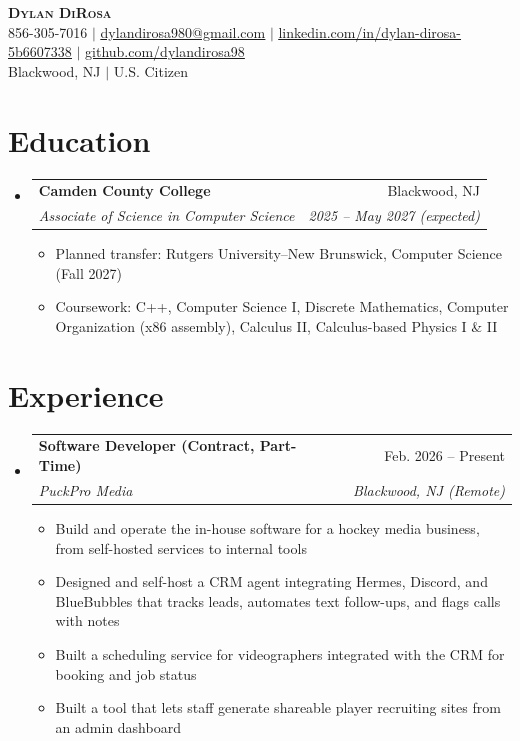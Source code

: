 \documentclass[letterpaper,11pt]{article}
\makeatletter
\newcommand{\resumeItem}[1]{
  \item\small{#1}
}
\newcommand{\resumeSubheading}[4]{
  \item
    \begin{tabular*}{0.97\textwidth}[t]{l@{\extracolsep{\fill}}r}
      \textbf{#1} & #2 \\[2pt]
      \textit{\small#3} & \textit{\small #4} \\
    \end{tabular*}
}
\newcommand{\resumeSubHeadingListStart}{\begin{itemize}[leftmargin=0.15in, label={}, itemsep=8pt, parsep=0pt, topsep=2pt, partopsep=0pt]}
\newcommand{\resumeSubHeadingListEnd}{\end{itemize}}
\newcommand{\resumeItemListStart}{\begin{itemize}[leftmargin=0.15in, itemsep=3pt, parsep=0pt, topsep=3pt, partopsep=0pt]}
\newcommand{\resumeItemListEnd}{\end{itemize}}
\makeatother
\begin{document}
\begin{center}
    \textbf{\Huge \scshape Dylan DiRosa} \\[6pt]
    \small 856-305-7016 $|$ \href{mailto:dylandirosa980@gmail.com}{\underline{dylandirosa980@gmail.com}} $|$
    \href{https://www.linkedin.com/in/dylan-dirosa-5b6607338/}{\underline{linkedin.com/in/dylan-dirosa-5b6607338}} $|$
    \href{https://github.com/dylandirosa98}{\underline{github.com/dylandirosa98}} \\[4pt]
    \small Blackwood, NJ $|$ U.S. Citizen
\end{center}

\section{Education}
  \resumeSubHeadingListStart
    \resumeSubheading
      {Camden County College}{Blackwood, NJ}
      {Associate of Science in Computer Science}{2025 -- May 2027 (expected)}
      \resumeItemListStart
        \resumeItem{Planned transfer: Rutgers University--New Brunswick, Computer Science (Fall 2027)}
        \resumeItem{Coursework: C++, Computer Science I, Discrete Mathematics, Computer Organization (x86 assembly), Calculus II, Calculus-based Physics I \& II}
      \resumeItemListEnd
  \resumeSubHeadingListEnd

\section{Experience}
  \resumeSubHeadingListStart
    \resumeSubheading
      {Software Developer (Contract, Part-Time)}{Feb. 2026 -- Present}
      {PuckPro Media}{Blackwood, NJ (Remote)}
      \resumeItemListStart
        \resumeItem{Build and operate the in-house software for a hockey media business, from self-hosted services to internal tools}
        \resumeItem{Designed and self-host a CRM agent integrating Hermes, Discord, and BlueBubbles that tracks leads, automates text follow-ups, and flags calls with notes}
        \resumeItem{Built a scheduling service for videographers integrated with the CRM for booking and job status}
        \resumeItem{Built a tool that lets staff generate shareable player recruiting sites from an admin dashboard}
      \resumeItemListEnd
  \resumeSubHeadingListEnd
\end{document}
